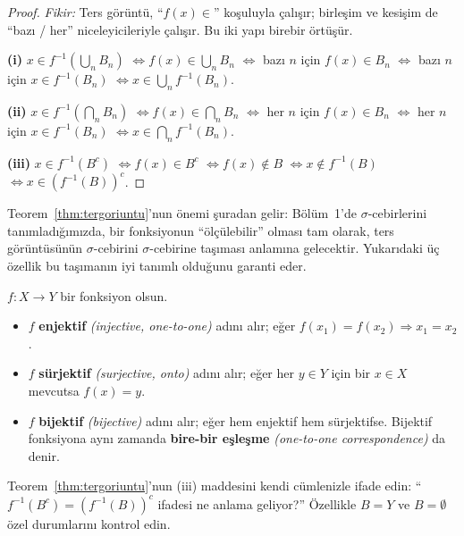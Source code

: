 \begin{proof}
\textit{Fikir:} Ters görüntü, ``$f(x) \in$'' koşuluyla çalışır; birleşim ve
kesişim de ``bazı / her'' niceleyicileriyle çalışır. Bu iki yapı birebir örtüşür.

\medskip

\textbf{(i)}\; $x \in f^{-1}\!\left(\bigcup_n B_n\right)$
$\iff f(x) \in \bigcup_n B_n$
$\iff$ bazı $n$ için $f(x) \in B_n$
$\iff$ bazı $n$ için $x \in f^{-1}(B_n)$
$\iff x \in \bigcup_n f^{-1}(B_n)$.

\textbf{(ii)}\; $x \in f^{-1}\!\left(\bigcap_n B_n\right)$
$\iff f(x) \in \bigcap_n B_n$
$\iff$ her $n$ için $f(x) \in B_n$
$\iff$ her $n$ için $x \in f^{-1}(B_n)$
$\iff x \in \bigcap_n f^{-1}(B_n)$.

\textbf{(iii)}\; $x \in f^{-1}(B^c)$
$\iff f(x) \in B^c$
$\iff f(x) \notin B$
$\iff x \notin f^{-1}(B)$
$\iff x \in \left(f^{-1}(B)\right)^c$.
\end{proof}

\begin{notkutu}
Teorem~\ref{thm:tergoriuntu}'nun önemi şuradan gelir: Bölüm~1'de
$\sigma$-cebirlerini tanımladığımızda, bir fonksiyonun ``ölçülebilir'' olması tam
olarak, ters görüntüsünün $\sigma$-cebirini $\sigma$-cebirine taşıması anlamına
gelecektir. Yukarıdaki üç özellik bu taşımanın iyi tanımlı olduğunu garanti eder.
\end{notkutu}

\begin{tanim}\label{def:bijektif}
$f: X \to Y$ bir fonksiyon olsun.
\begin{itemize}
  \item $f$ \textbf{enjektif} \emph{(injective, one-to-one)} adını alır;
        eğer $f(x_1) = f(x_2) \Rightarrow x_1 = x_2$.
  \item $f$ \textbf{sürjektif} \emph{(surjective, onto)} adını alır;
        eğer her $y \in Y$ için bir $x \in X$ mevcutsa $f(x) = y$.
  \item $f$ \textbf{bijektif} \emph{(bijective)} adını alır;
        eğer hem enjektif hem sürjektifse.
        Bijektif fonksiyona aynı zamanda \textbf{bire-bir eşleşme}
        \emph{(one-to-one correspondence)} da denir.
\end{itemize}
\end{tanim}

\begin{kendinleifade}
Teorem~\ref{thm:tergoriuntu}'nun (iii) maddesini kendi cümlenizle ifade edin:
``$f^{-1}(B^c) = (f^{-1}(B))^c$ ifadesi ne anlama geliyor?''
Özellikle $B = Y$ ve $B = \emptyset$ özel durumlarını kontrol edin.
\end{kendinleifade}

